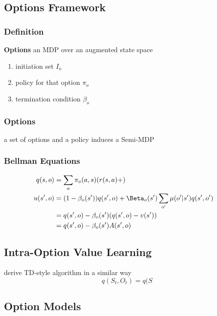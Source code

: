 \documentclass[]{article}
\theoremstyle{definition}
\begin{document}
\subsection{Options Framework}
\label{sub:options_framework}

\subsubsection{Definition}
\label{ssub:definition}
\textbf{Options} an MDP over an augmented state space
\begin{enumerate}
    \item initiation set $I_o$
    \item policy for that option $\pi_o$
    \item termination condition $\beta_o$
\end{enumerate}

\subsubsection{Options}
\label{ssub:options}
a set of options and a policy induces a Semi-MDP

\subsubsection{Bellman Equations}
\label{ssub:options_bellman_equations}

\begin{align*}
    q(s,o) &= \sum_a \pi_o (a,s) (r(s,a) + )   \\
    u(s',o) & = (1 - \beta_o(s')) q(s', o) + \Beta_o(s') \sum_{o'} \mu (o'|s')q(s',o') &\\
    &= q(s',o) - \beta_o(s')(q(s',o) - v(s')) \\
    &= q(s',o) - \beta_o(s')A(s',o) \\
\end{align*}

\subsection{Intra-Option Value Learning}
\label{sub:intra_option_value_learning}

derive TD-style algorithm in a similar way
\begin{equation}
    q(S_t, O_t) = q(S
\end{equation}

\subsection{Option Models}
\label{sub:option_models}
\end{document}
